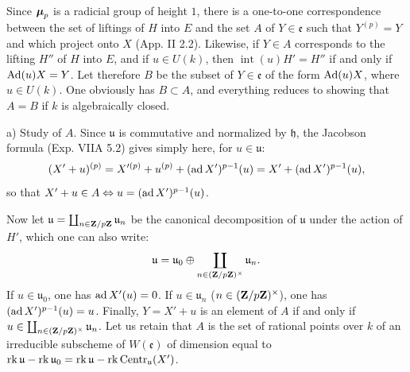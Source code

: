 Since $\boldsymbol{\mu}_p$ is a radicial group of height $1$, there is a one-to-one correspondence between the set of liftings of $H$ into $E$ and the set $A$ of $Y\in\mathfrak e$ such that $Y^{(p)}=Y$ and which project onto $X$ (App. II 2.2). Likewise, if $Y\in A$ corresponds to the lifting $H''$ of $H$ into $E$, and if $u\in U(k)$, then $\operatorname{int}(u)H'=H''$ if and only if $\operatorname{Ad}(u)X=Y$. Let therefore $B$ be the subset of $Y\in\mathfrak e$ of the form $\operatorname{Ad}(u)X$, where $u\in U(k)$. One obviously has $B\subset A$, and everything reduces to showing that $A=B$ if $k$ is algebraically closed.

\noindent a) Study of $A$. Since $\mathfrak u$ is commutative and normalized by $\mathfrak h$, the Jacobson formula (Exp. VIIA 5.2) gives simply here, for $u\in\mathfrak u$:
\[
 (X'+u)^{(p)}=X'^{(p)}+u^{(p)}+(\operatorname{ad} X')^{p-1}(u)
 =X'+(\operatorname{ad} X')^{p-1}(u),
\]
so that $X'+u\in A\Leftrightarrow u=(\operatorname{ad} X')^{p-1}(u)$.

Now let $\mathfrak u=\coprod_{n\in\mathbf{Z}/p\mathbf{Z}}\mathfrak u_n$ be the canonical decomposition of $\mathfrak u$ under the action of $H'$, which one can also write:
\[
 \mathfrak u=\mathfrak u_0\oplus
 \coprod_{n\in(\mathbf{Z}/p\mathbf{Z})^\times}\mathfrak u_n.
\]
If $u\in\mathfrak u_0$, one has $\operatorname{ad} X'(u)=0$. If $u\in\mathfrak u_n$ ($n\in(\mathbf{Z}/p\mathbf{Z})^\times$), one has $(\operatorname{ad} X')^{p-1}(u)=u$. Finally, $Y=X'+u$ is an element of $A$ if and only if $u\in\coprod_{n\in(\mathbf{Z}/p\mathbf{Z})^\times}\mathfrak u_n$. Let us retain that $A$ is the set of rational points over $k$ of an irreducible subscheme of $W(\mathfrak e)$ of dimension equal to $\operatorname{rk}\mathfrak u-\operatorname{rk}\mathfrak u_0=\operatorname{rk}\mathfrak u-\operatorname{rk}\operatorname{Centr}_{\mathfrak u}(X')$.

